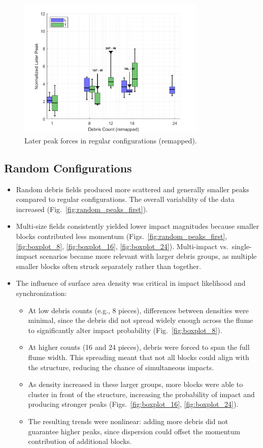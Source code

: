 \documentclass{article}
\begin{document}
\begin{figure}[htbp]
    \centering
    \includegraphics[width=0.8\textwidth]{LaterPeak_Regular_RemappedT.png}
    \caption{Later peak forces in regular configurations (remapped).}
    \label{fig:laterpeak_regular_remap}
\end{figure}
\subsection{Random Configurations}
\begin{itemize}
    \item Random debris fields produced more scattered and generally smaller peaks compared to regular configurations. The overall variability of the data increased (Fig.~\ref{fig:random_peaks_first}). 
    \item Multi-size fields consistently yielded lower impact magnitudes because smaller blocks contributed less momentum (Figs.~\ref{fig:random_peaks_first}, \ref{fig:boxplot_8}, \ref{fig:boxplot_16}, \ref{fig:boxplot_24}). Multi-impact vs.\ single-impact scenarios became more relevant with larger debris groups, as multiple smaller blocks often struck separately rather than together.
    \item The influence of surface area density was critical in impact likelihood and synchronization:
    \begin{itemize}
        \item At low debris counts (e.g., 8 pieces), differences between densities were minimal, since the debris did not spread widely enough across the flume to significantly alter impact probability (Fig.~\ref{fig:boxplot_8}).
        \item At higher counts (16 and 24 pieces), debris were forced to span the full flume width. This spreading meant that not all blocks could align with the structure, reducing the chance of simultaneous impacts.
        \item As density increased in these larger groups, more blocks were able to cluster in front of the structure, increasing the probability of impact and producing stronger peaks (Figs.~\ref{fig:boxplot_16}, \ref{fig:boxplot_24}).
        \item The resulting trends were nonlinear: adding more debris did not guarantee higher peaks, since dispersion could offset the momentum contribution of additional blocks.
    \end{itemize}
\end{itemize}
\end{document}

